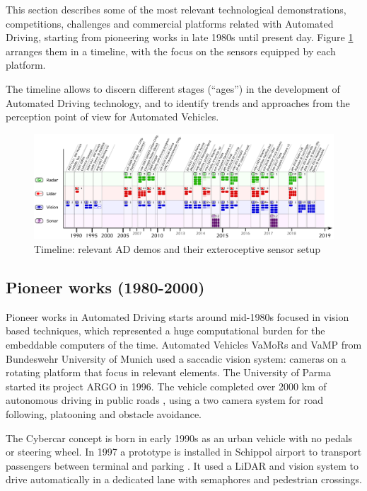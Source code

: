 This section describes some of the most relevant technological demonstrations, 
competitions, challenges and commercial platforms related with Automated 
Driving, starting from pioneering works in late 1980s until present day. Figure 
\ref{fig:tech-demos} arranges them in a timeline, with the focus on the sensors 
equipped by each platform.

The timeline allows to discern different stages (``ages'') in the development 
of Automated Driving technology, and to identify trends and approaches from the 
perception point of view for Automated Vehicles.

\begin{figure}[p] %
  \includegraphics[width=0.95\textheight,angle=90,keepaspectratio]{"img/AD_demos_Timeline"}
  \caption{Timeline: relevant AD demos and their exteroceptive sensor 
  setup}
  \label{fig:tech-demos}
\end{figure}

\subsection{Pioneer works (1980-2000)}

Pioneer works in Automated Driving starts around mid-1980s focused in vision 
based techniques, which represented a huge computational burden for the
embeddable computers of the time. Automated Vehicles VaMoRs 
\cite{Dickmanns1987} and VaMP \cite{Gregor2002} from Bundeswehr 
University of Munich used a saccadic vision system: cameras on a rotating 
platform that focus in relevant elements. 
The University of Parma started its project ARGO in 1996. %
The vehicle completed over 2000 km of autonomous driving in public roads 
\cite{Broggi1999}, using a two camera system for road following,
platooning and obstacle avoidance. 

The Cybercar concept is born in early 1990s \cite{Parent1993}
as an urban vehicle with no pedals or steering wheel. 
In 1997 a prototype is installed in Schippol airport to transport passengers 
between terminal and parking \cite{Ozguner2007}. It used a LiDAR and vision
system to drive automatically in a dedicated lane with semaphores and
pedestrian crossings.

